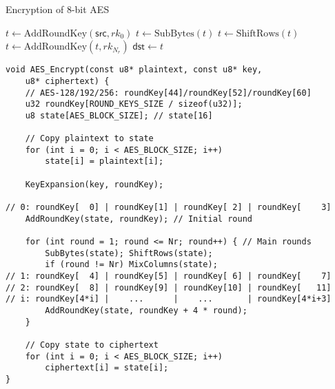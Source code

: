 \begin{algorithm}[H]
	\caption{Encryption of 8-bit AES}
	
	\BlankLine
	$t \leftarrow \text{AddRoundKey}(\mathsf{src}, rk_0)$
	$t \leftarrow \text{SubBytes}(t)$\;
	$t \leftarrow \text{ShiftRows}(t)$\;
	$t \leftarrow \text{AddRoundKey}(t, rk_{N_r})$\;
	$\mathsf{dst} \leftarrow t$\;
	\;
\end{algorithm}

\begin{lstlisting}[style=C, caption={8-bit AES Encryption},captionpos=t]
void AES_Encrypt(const u8* plaintext, const u8* key,
	u8* ciphertext) {
	// AES-128/192/256: roundKey[44]/roundKey[52]/roundKey[60]
	u32 roundKey[ROUND_KEYS_SIZE / sizeof(u32)];
	u8 state[AES_BLOCK_SIZE]; // state[16]
	
	// Copy plaintext to state
	for (int i = 0; i < AES_BLOCK_SIZE; i++)
		state[i] = plaintext[i];
	
	KeyExpansion(key, roundKey);
	
// 0: roundKey[  0] | roundKey[1] | roundKey[ 2] | roundKey[    3]
	AddRoundKey(state, roundKey); // Initial round
	
	for (int round = 1; round <= Nr; round++) { // Main rounds
		SubBytes(state); ShiftRows(state);
		if (round != Nr) MixColumns(state);
// 1: roundKey[  4] | roundKey[5] | roundKey[ 6] | roundKey[    7]
// 2: roundKey[  8] | roundKey[9] | roundKey[10] | roundKey[   11]
// i: roundKey[4*i] |    ...      |    ...       | roundKey[4*i+3]
		AddRoundKey(state, roundKey + 4 * round);
	}
	
	// Copy state to ciphertext
	for (int i = 0; i < AES_BLOCK_SIZE; i++)
		ciphertext[i] = state[i];
}
\end{lstlisting}

